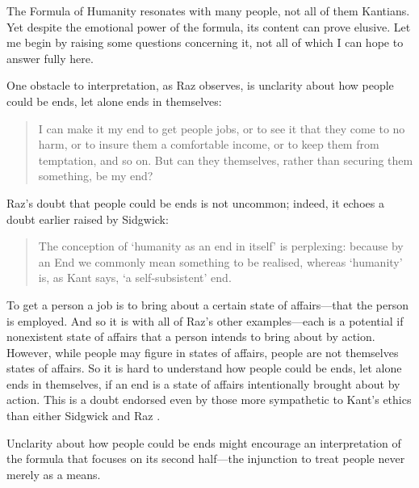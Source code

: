 \documentclass[a4paper,12pt]{article}
\begin{document}
The Formula of Humanity resonates with many people, not all of them Kantians. Yet despite the emotional power of the formula, its content can prove elusive. Let me begin by raising some questions concerning it, not all of which I can hope to answer fully here.

One obstacle to interpretation, as Raz observes, is unclarity about how people could be ends, let alone ends in themselves: 
\begin{quote}
	I can make it my end to get people jobs, or to see it that they come to no harm, or to insure them a comfortable income, or to keep them from temptation, and so on. But can they themselves, rather than securing them something, be my end? \citep[144]{Raz:2001ps} 
\end{quote}
Raz's doubt that people could be ends is not uncommon; indeed, it echoes a doubt earlier raised by Sidgwick:
\begin{quote}
    The conception of `humanity as an end in itself' is perplexing: because by an End we commonly mean something to be realised, whereas `humanity' is, as Kant says, `a self-subsistent' end. \citep[39]{Sidgwick:1981jk}
\end{quote}
To get a person a job is to bring about a certain state of affairs---that the person is employed. And so it is with all of Raz's other examples---each is a potential if nonexistent state of affairs that a person intends to bring about by action. However, while people may figure in states of affairs, people are not themselves states of affairs. So it is hard to understand how people could be ends, let alone ends in themselves, if an end is a state of affairs intentionally brought about by action. This is a doubt endorsed even by those more sympathetic to Kant's ethics than either Sidgwick and Raz \citep[see, for example,][]{Lo:1987xy,Ross:1954jk,Wolff:1973qv}.

Unclarity about how people could be ends might encourage an interpretation of the formula that focuses on its second half---the injunction to treat people never merely as a means.
\end{document}
